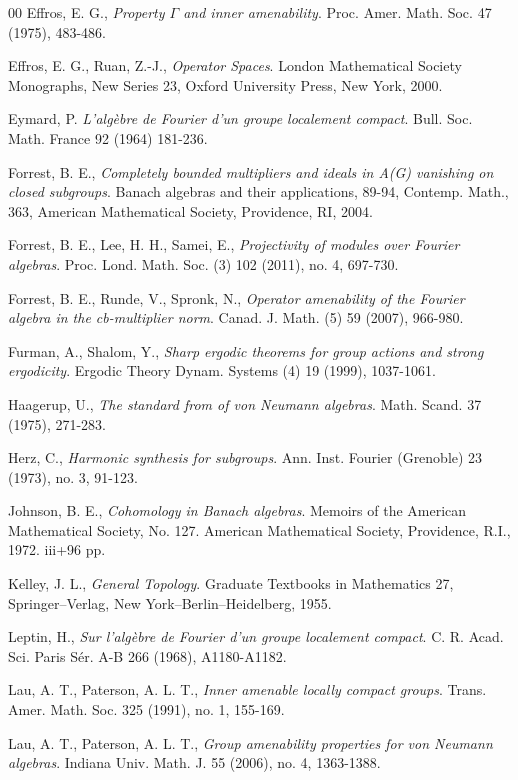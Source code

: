 \documentclass[preprint,12pt]{elsarticle}
\newcommand{\e}[1]{\emph{#1}}
\begin{document}
\begin{thebibliography}{00}
 Effros, E. G.,
\e{Property $\Gamma$ and inner amenability}.
Proc. Amer. Math. Soc. 47 (1975), 483-486.


 Effros, E. G., Ruan, Z.-J.,
\e{Operator Spaces}.
London Mathematical Society Monographs, New Series 23, Oxford University Press, New York, 2000.


 Eymard, P.
\e{L'alg\`{e}bre de Fourier d'un groupe localement compact}.
Bull. Soc. Math. France 92 (1964) 181-236.


 Forrest, B. E.,
\e{Completely bounded multipliers and ideals in A(G) vanishing on closed subgroups}.
Banach algebras and their applications, 89-94, Contemp. Math., 363,
American Mathematical Society, Providence, RI, 2004.

 Forrest, B. E., Lee, H. H., Samei, E.,
\e{Projectivity of modules over Fourier algebras}.
Proc. Lond. Math. Soc. (3) 102 (2011), no. 4, 697-730.

 Forrest, B. E., Runde, V., Spronk, N.,
\e{Operator amenability of the Fourier algebra in the cb-multiplier norm}.
Canad. J. Math. (5) 59 (2007), 966-980.

 Furman, A., Shalom, Y.,
\e{Sharp ergodic theorems for group actions and strong ergodicity}.
Ergodic Theory Dynam. Systems (4) 19 (1999), 1037-1061.


 Haagerup, U.,
\e{The standard from of von Neumann algebras}.
Math. Scand. 37 (1975), 271-283.


 Herz, C.,
\e{Harmonic synthesis for subgroups}.
Ann. Inst. Fourier (Grenoble) 23 (1973), no. 3, 91-123.


 Johnson, B. E.,
\e{Cohomology in Banach algebras}.
Memoirs of the American Mathematical Society, No. 127. American Mathematical Society, Providence, R.I., 1972. iii+96 pp.


 Kelley, J. L.,
\e{General Topology}.
Graduate Textbooks in Mathematics 27, Springer--Verlag, New York--Berlin--Heidelberg, 1955.


 Leptin, H.,
\e{Sur l'alg\`{e}bre de Fourier d'un groupe localement compact}.
C. R. Acad. Sci. Paris S\'{e}r. A-B 266 (1968), A1180-A1182.

 Lau, A. T., Paterson, A. L. T.,
\e{Inner amenable locally compact groups}.
Trans. Amer. Math. Soc. 325 (1991), no. 1, 155-169.

 Lau, A. T., Paterson, A. L. T.,
\e{Group amenability properties for von Neumann algebras}.
Indiana Univ. Math. J. 55 (2006), no. 4, 1363-1388.


\end{thebibliography}
\end{document}
